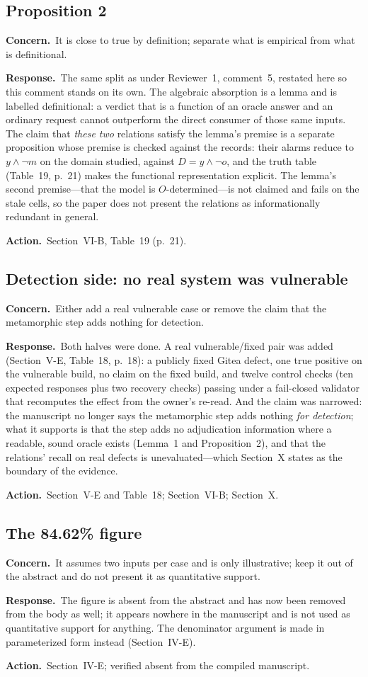 \documentclass[10pt,letterpaper]{article}
\newcommand{\Concern}[1]{\par\smallskip\noindent\textbf{Concern.}\ #1\par}
\newcommand{\Response}[1]{\par\smallskip\noindent\textbf{Response.}\ #1\par}
\newcommand{\Action}[1]{\par\smallskip\noindent\textbf{Action.}\ #1\par}
\begin{document}
\subsection{Proposition 2}
\Concern{It is close to true by definition; separate what is empirical from what
is definitional.}
\Response{The same split as under Reviewer~1, comment~5, restated here so this
comment stands on its own. The algebraic absorption is a lemma and is labelled
definitional: a verdict that is a function of an oracle answer and an ordinary
request cannot outperform the direct consumer of those same inputs. The claim
that \emph{these two} relations satisfy the lemma's premise is a separate
proposition whose premise is checked against the records: their alarms reduce to
$y\wedge\neg m$ on the domain studied, against $D=y\wedge\neg o$, and the truth
table (Table~19, p.~21) makes the functional representation explicit. The
lemma's second premise---that the model is $O$-determined---is not claimed and
fails on the stale cells, so the paper does not present the relations as
informationally redundant in general.}
\Action{Section~VI-B, Table~19 (p.~21).}

\subsection{Detection side: no real system was vulnerable}
\Concern{Either add a real vulnerable case or remove the claim that the
metamorphic step adds nothing for detection.}
\Response{Both halves were done. A real vulnerable/fixed pair was added
(Section~V-E, Table~18, p.~18): a publicly fixed Gitea defect, one true positive
on the vulnerable build, no claim on the fixed build, and twelve control checks
(ten expected responses plus two recovery checks) passing under a fail-closed
validator that recomputes the effect from the owner's re-read. And the claim was
narrowed: the manuscript no longer says the
metamorphic step adds nothing \emph{for detection}; what it supports is that the
step adds no adjudication information where a readable, sound oracle exists
(Lemma~1 and Proposition~2), and that the relations' recall on real defects is
unevaluated---which Section~X states as the boundary of the evidence.}
\Action{Section~V-E and Table~18; Section~VI-B; Section~X.}

\subsection{The 84.62\% figure}
\Concern{It assumes two inputs per case and is only illustrative; keep it out of
the abstract and do not present it as quantitative support.}
\Response{The figure is absent from the abstract and has now been removed from
the body as well; it appears nowhere in the manuscript and is not used as
quantitative support for anything. The denominator argument is made in
parameterized form instead (Section~IV-E).}
\Action{Section~IV-E; verified absent from the compiled manuscript.}
\end{document}
